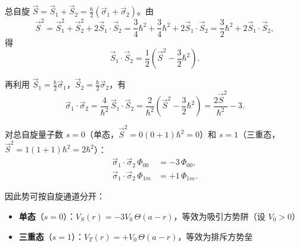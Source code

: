 \begin{derivationbox}
总自旋 $\vec{S} = \vec{S}_1 + \vec{S}_2 = \frac{\hbar}{2}(\vec{\sigma}_1 + \vec{\sigma}_2)$。由
\[
\vec{S}^2 = \vec{S}_1^2 + \vec{S}_2^2 + 2\vec{S}_1 \cdot \vec{S}_2 = \frac{3}{4}\hbar^2 + \frac{3}{4}\hbar^2 + 2\vec{S}_1 \cdot \vec{S}_2 = \frac{3}{2}\hbar^2 + 2\vec{S}_1 \cdot \vec{S}_2,
\]
得
\[
\vec{S}_1 \cdot \vec{S}_2 = \frac{1}{2}\left( \vec{S}^2 - \frac{3}{2}\hbar^2 \right).
\]

再利用 $\vec{S}_1 = \frac{\hbar}{2}\vec{\sigma}_1$，$\vec{S}_2 = \frac{\hbar}{2}\vec{\sigma}_2$，有
\[
\vec{\sigma}_1 \cdot \vec{\sigma}_2 = \frac{4}{\hbar^2}\, \vec{S}_1 \cdot \vec{S}_2 = \frac{2}{\hbar^2}\left( \vec{S}^2 - \frac{3}{2}\hbar^2 \right) = \frac{2\vec{S}^2}{\hbar^2} - 3.
\]

对总自旋量子数 $s = 0$（单态，$\vec{S}^2 = 0(0+1)\hbar^2 = 0$）和 $s = 1$（三重态，$\vec{S}^2 = 1(1+1)\hbar^2 = 2\hbar^2$）：
\begin{align*}
\vec{\sigma}_1 \cdot \vec{\sigma}_2 \, \Phi_{00} &= -3 \, \Phi_{00}, \\
\vec{\sigma}_1 \cdot \vec{\sigma}_2 \, \Phi_{1m} &= +1 \, \Phi_{1m}.
\end{align*}

因此势可按自旋通道分开：
\begin{itemize}
    \item \textbf{单态}（$s = 0$）：$V_S(r) = -3V_0 \, \Theta(a - r)$，等效为吸引方势阱（设 $V_0 > 0$）
    \item \textbf{三重态}（$s = 1$）：$V_T(r) = +V_0 \, \Theta(a - r)$，等效为排斥方势垒
\end{itemize}
\end{derivationbox}

